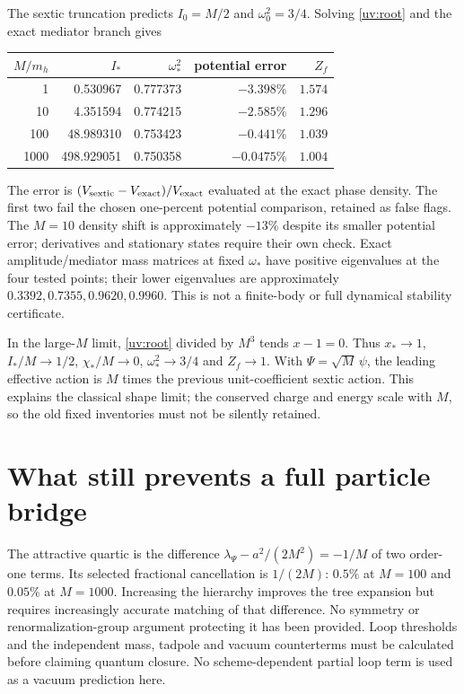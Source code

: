 \documentclass[11pt]{article}
\begin{document}
The sextic truncation predicts $I_0=M/2$ and $\omega_0^2=3/4$.
Solving \eqref{uv:root} and the exact mediator branch gives
\begin{center}
\begin{tabular}{rrrrr}
\toprule
$M/m_h$ & $I_*$ & $\omega_*^2$ & potential error & $Z_f$\\
\midrule
1 & 0.530967 & 0.777373 & $-3.398\%$ & $1.574$\\
10 & 4.351594 & 0.774215 & $-2.585\%$ & $1.296$\\
100 & 48.989310 & 0.753423 & $-0.441\%$ & $1.039$\\
1000 & 498.929051 & 0.750358 & $-0.0475\%$ & $1.004$\\
\bottomrule
\end{tabular}
\end{center}
The error is $(V_{\rm sextic}-V_{\rm exact})/V_{\rm exact}$ evaluated
at the exact phase density. The first two fail the chosen one-percent
potential comparison, retained as false flags. The $M=10$ density shift
is approximately $-13\%$ despite its smaller potential error; derivatives
and stationary states require their own check. Exact amplitude/mediator
mass matrices at fixed $\omega_*$ have positive eigenvalues at the four
tested points; their lower eigenvalues are approximately
$0.3392,0.7355,0.9620,0.9960$. This is not a finite-body or full dynamical
stability certificate.

In the large-$M$ limit, \eqref{uv:root} divided by $M^3$ tends $x-1=0$.
Thus $x_*\to1$, $I_*/M\to1/2$, $\chi_*/M\to0$, $\omega_*^2\to3/4$
and $Z_f\to1$. With $\Psi=\sqrt M\,\psi$, the leading effective action
is $M$ times the previous unit-coefficient sextic action. This explains
the classical shape limit; the conserved charge and energy scale with $M$,
so the old fixed inventories must not be silently retained.

\section{What still prevents a full particle bridge}
The attractive quartic is the difference
$\lambda_\Psi-a^2/(2M^2)=-1/M$ of two order-one terms.
Its selected fractional cancellation is $1/(2M)$: $0.5\%$ at $M=100$
and $0.05\%$ at $M=1000$. Increasing the hierarchy improves the tree
expansion but requires increasingly accurate matching of that difference.
No symmetry or renormalization-group argument protecting it has been
provided. Loop thresholds and the independent mass, tadpole and vacuum
counterterms must be calculated before claiming quantum closure. No
scheme-dependent partial loop term is used as a vacuum prediction here.
\end{document}
